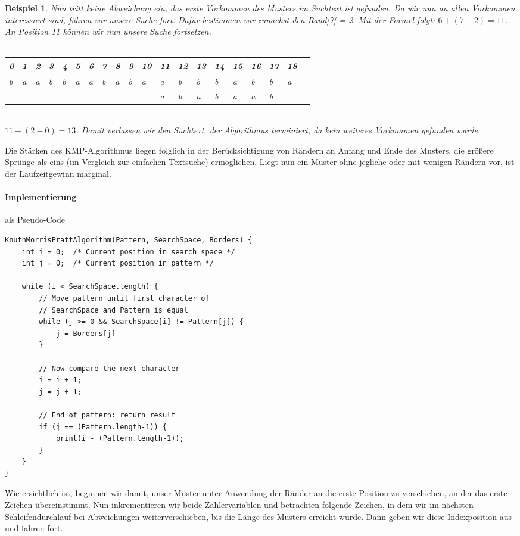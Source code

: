 \documentclass[11pt,a4paper]{scrartcl}
\newtheorem{example}{Beispiel}
\begin{document}
\begin{example}
Nun tritt keine Abweichung ein, das erste Vorkommen des Musters im Suchtext ist gefunden. Da wir nun an allen Vorkommen interessiert sind, führen wir unsere Suche fort. Dafür bestimmen wir zunächst den Rand[7] = 2. Mit der Formel folgt: $6+(7-2) = 11$. An Position 11 können wir nun unsere Suche fortsetzen.\\\\
\begin{tabular}{|l|l|l|l|l|l|l|l|l|l|l|l|l|l|l|l|l|l|l|l|}
\hline
0&1&2&3&4&5&6&7&8&9&10&11&12&13&14&15&16&17&18 \\
\hline
b&a&a&b&b&a&a&b&a&b&a&\cellcolor{green}a&\cellcolor{green}b&\cellcolor{red}b&b&a&b&b&a \\
\hline
 & & & & & & & & & & &\cellcolor{green}a&\cellcolor{green}b&\cellcolor{red}a&b&a&a&b&    \\
\hline
\end{tabular}\\
$11+(2-0) = 13$. Damit verlassen wir den Suchtext, der Algorithmus terminiert, da kein weiteres Vorkommen gefunden wurde.
\end{example}
Die Stärken des KMP-Algorithmus liegen folglich in der Berücksichtigung von Rändern an Anfang und Ende des Musters, die größere Sprünge als eins (im Vergleich zur einfachen Textsuche) ermöglichen. Liegt nun ein Muster ohne jegliche oder mit wenigen Rändern vor, ist der Laufzeitgewinn marginal.
\paragraph{Implementierung}
als Pseudo-Code
\begin{lstlisting}
KnuthMorrisPrattAlgorithm(Pattern, SearchSpace, Borders) {
	int i = 0;	/* Current position in search space */
	int j = 0;	/* Current position in pattern */

	while (i < SearchSpace.length) {
		// Move pattern until first character of 
		// SearchSpace and Pattern is equal
		while (j >= 0 && SearchSpace[i] != Pattern[j]) {
			j = Borders[j]		
		} 
		
		// Now compare the next character
		i = i + 1;
		j = j + 1;

		// End of pattern: return result		
		if (j == (Pattern.length-1)) {
			print(i - (Pattern.length-1));		
		}
	}
}
\end{lstlisting}
Wie ersichtlich ist, beginnen wir damit, unser Muster unter Anwendung der Ränder an die erste Position zu verschieben, an der das erste Zeichen übereinstimmt. Nun inkrementieren wir beide Zählervariablen und betrachten folgende Zeichen, in dem wir im nächsten Schleifendurchlauf bei Abweichungen weiterverschieben, bis die Länge des Musters erreicht wurde. Dann geben wir diese Indexposition aus und fahren fort. 
\end{document}
